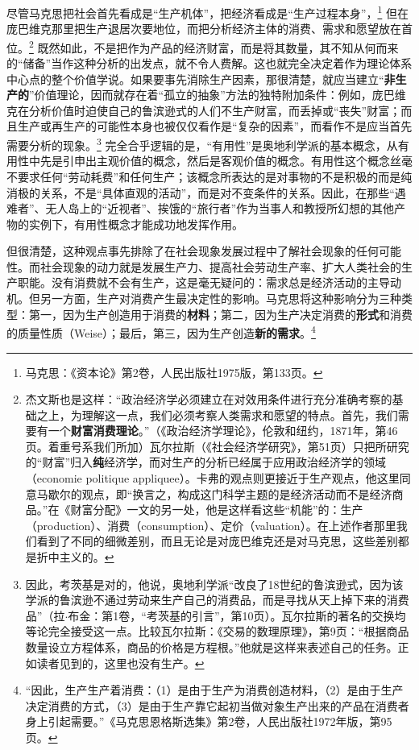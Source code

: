 \documentclass[fontset=fandol, a4paper, 12pt, openright]{ctexbook}
\begin{document}
尽管马克思把社会首先看成是“生产机体”，把经济看成是“生产过程本身”，\footnote{马克思：《资本论》第2卷，人民出版社1975版，第133页。} 但在庞巴维克那里把生产退居次要地位，而把分析经济主体的消费、需求和愿望放在首位。\footnote{杰文斯也是这样：“政治经济学必须建立在对效用条件进行充分准确考察的基础之上，为理解这一点，我们必须考察人类需求和愿望的特点。首先，我们需要有一个\textbf{财富消费理论}。”（《政治经济学理论》，伦敦和纽约，1871年，第46页。着重号系我们所加）瓦尔拉斯（《社会经济学研究》，第51页）只把所研究的“财富”归入\textbf{纯}经济学，而对生产的分析已经属于应用政治经济学的领域（economie politique appliquee）。卡弗的观点则更接近于生产观点，他这里同意马歇尔的观点，即“换言之，构成这门科学主题的是经济活动而不是经济商品。”在《财富分配》一文的另一处，他是这样看这些“机能”的：生产（production）、消费（consumption）、定价（valuation）。在上述作者那里我们看到了不同的细微差别，而且无论是对庞巴维克还是对马克思，这些差别都是折中主义的。} 既然如此，不是把作为产品的经济财富，而是将其数量，其不知从何而来的“储备”当作这种分析的出发点，就不令人费解。这也就完全决定着作为理论体系中心点的整个价值学说。如果要事先消除生产因素，那很清楚，就应当建立“\textbf{非生产的}”价值理论，因而就存在着“孤立的抽象”方法的独特附加条件：例如，庞巴维克在分析价值时迫使自己的鲁滨逊式的人们不生产财富，而丢掉或“丧失”财富；而且生产或再生产的可能性本身也被仅仅看作是“复杂的因素”，而看作不是应当首先需要分析的现象。\footnote{因此，考茨基是对的，他说，奥地利学派“改良了18世纪的鲁滨逊式，因为该学派的鲁滨逊不通过劳动来生产自己的消费品，而是寻找从天上掉下来的消费品”（拉$\cdot$布金：第1卷，“考茨基的引言”，第10页）。瓦尔拉斯的著名的交换均等论完全接受这一点。比较瓦尔拉斯：《交易的数理原理》，第9页：“根据商品数量设立方程体系，商品的价格是方程根。”他就是这样来表述自己的任务。正如读者见到的，这里也没有生产。} 完全合乎逻辑的是，“有用性”是奥地利学派的基本概念，从有用性中先是引申出主观价值的概念，然后是客观价值的概念。有用性这个概念丝毫不要求任何“劳动耗费”和任何生产；该概念所表达的是对事物的不是积极的而是纯消极的关系，不是“具体直观的活动”，而是对不变条件的关系。因此，在那些“遇难者”、无人岛上的“近视者”、挨饿的“旅行者”作为当事人和教授所幻想的其他产物的实例下，有用性概念才能成功地发挥作用。

但很清楚，这种观点事先排除了在社会现象发展过程中了解社会现象的任何可能性。而社会现象的动力就是发展生产力、提高社会劳动生产率、扩大人类社会的生产职能。没有消费就不会有生产，这是毫无疑问的：需求总是经济活动的主导动机。但另一方面，生产对消费产生最决定性的影响。马克思将这种影响分为三种类型：第一，因为生产创造用于消费的\textbf{材料}；第二，因为生产决定消费的\textbf{形式}和消费的质量性质（Weise）；最后，第三，因为生产创造\textbf{新的需求}。\footnote{“因此，生产生产着消费：（1）是由于生产为消费创造材料，（2）是由于生产决定消费的方式，（3）是由于生产靠它起初当做对象生产出来的产品在消费者身上引起需要。”《马克思恩格斯选集》第2卷，人民出版社1972年版，第95页。}
\end{document}
